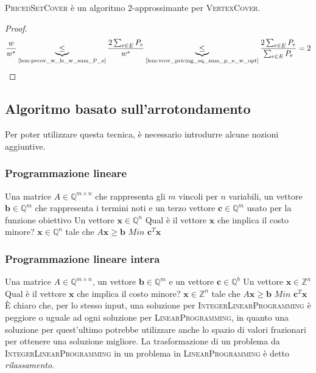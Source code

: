 \begin{theorem}
	\textsc{PricedSetCover} è un algoritmo $2$-approssimante per \textsc{VertexCover}.
\end{theorem}

\begin{proof}
	$$
		\frac{w}{w^*} \underbrace{\leq}_\text{\cref{lem:pvcov_w_le_w_sum_P_e}}
		\frac{2\sum_{e \in E} P_e}{w^*}
		\underbrace{\leq}_\text{\cref{lem:vcov_pricing_eq_sum_p_e_w_opt}}
		\frac{2 \sum_{e \in E} P_e}{\sum_{e \in E} P_e} = 2
	$$
\end{proof}


\subsection{Algoritmo basato sull'arrotondamento}
Per poter utilizzare questa tecnica, è necessario introdurre alcune nozioni
aggiuntive.
\subsubsection{Programmazione lineare}
{Una matrice $A \in \mathbb{Q}^{m \times n}$ che rappresenta gli $m$ vincoli per
$n$ variabili, un vettore $\mathbf{b} \in \mathbb{Q}^{m}$  che
rappresenta i termini noti e un terzo vettore $\mathbf{c} \in \mathbb{Q}^m$
usato per la funzione obiettivo}
{Un vettore $\mathbf{x} \in \mathbb{Q}^n$}
{Qual è il vettore $\mathbf{x}$ che implica il costo minore?}
{$\mathbf{x}\in \mathbb{Q}^{n}$ tale che $A \mathbf{x} \geq \mathbf{b}$}
{$Min$}
{ $\mathbf{c}^T \mathbf{x}$ }

\subsubsection{Programmazione lineare intera}
{Una matrice $A \in \mathbb{Q}^{m \times n}$, un vettore $\mathbf{b} \in \mathbb{Q}^{m}$
	e un vettore $\mathbf{c} \in \mathbb{Q}^b$}
{Un vettore $\mathbf{x} \in \mathbb{Z}^n$}
{Qual è il vettore $\mathbf{x}$ che implica il costo minore?}
{$\mathbf{x}\in \mathbb{Z}^{n}$ tale che $A \mathbf{x} \geq \mathbf{b}$}
{$Min$}
{ $\mathbf{c}^T \mathbf{x}$ }
\`E chiaro che, per lo stesso input, una soluzione per \textsc{IntegerLinearProgramming}
è peggiore o uguale ad ogni soluzione per \textsc{LinearProgramming}, in quanto una
soluzione per quest'ultimo potrebbe utilizzare anche lo spazio di valori frazionari
per ottenere una soluzione migliore. La trasformazione di un problema da \textsc{IntegerLinearProgramming}
in un problema in \textsc{LinearProgramming} è detto \textit{rilassamento}.

